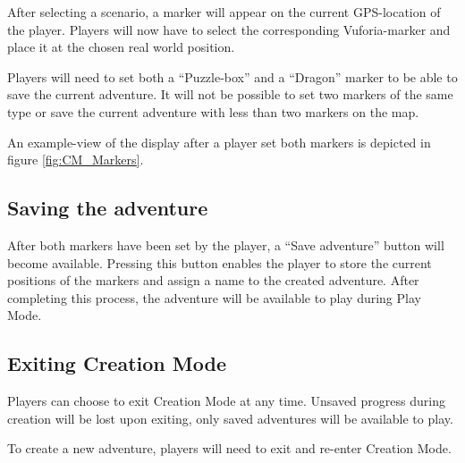 \documentclass{sigchi-ext}
\begin{document}
After selecting a scenario, a marker will appear on the current GPS-location of the player. Players will now have to select the corresponding Vuforia-marker and place it at the chosen real world position.

Players will need to set both a ``Puzzle-box'' and a ``Dragon'' marker to be able to save the current adventure. It will not be possible to set two markers of the same type or save the current adventure with less than two markers on the map.

An example-view of the display after a player set both markers is depicted in figure \ref{fig:CM_Markers}.



\subsection{Saving the adventure}

After both markers have been set by the player, a ``Save adventure'' button will become available. Pressing this button enables the player to store the current positions of the markers and assign a name to the created adventure. After completing this process, the adventure will be available to play during Play Mode.

\subsection{Exiting Creation Mode}

Players can choose to exit Creation Mode at any time. Unsaved progress during creation will be lost upon exiting, only saved adventures will be available to play.

To create a new adventure, players will need to exit and re-enter Creation Mode.
\end{document}
